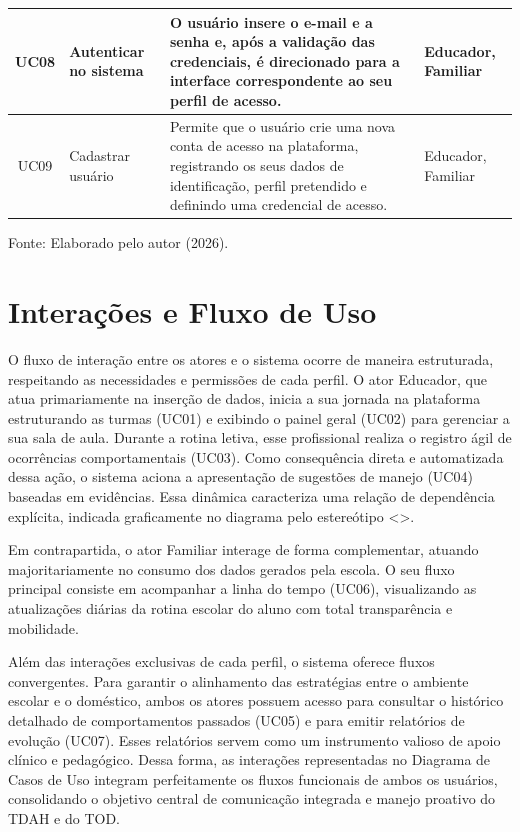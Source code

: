 \begin{quadro}[H]
\begin{tabular}{|c|p{3.2cm}|p{7.3cm}|p{2.5cm}|}
        UC08 & Autenticar no sistema & O usuário insere o e-mail e a senha e, após a validação das credenciais, é direcionado para a interface correspondente ao seu perfil de acesso. & Educador, Familiar \\ \hline

        UC09 & Cadastrar usuário & Permite que o usuário crie uma nova conta de acesso na plataforma, registrando os seus dados de identificação, perfil pretendido e definindo uma credencial de acesso. & Educador, Familiar \\ \hline
    \end{tabular}
    
    \vspace{0.1cm}
    \begin{flushleft}
        \footnotesize Fonte: Elaborado pelo autor (2026).
    \end{flushleft}
\end{quadro}

\vspace{0.5cm}
\section{Interações e Fluxo de Uso}

O fluxo de interação entre os atores e o sistema ocorre de maneira estruturada, respeitando as necessidades e permissões de cada perfil. O ator Educador, que atua primariamente na inserção de dados, inicia a sua jornada na plataforma estruturando as turmas (UC01) e exibindo o painel geral (UC02) para gerenciar a sua sala de aula. Durante a rotina letiva, esse profissional realiza o registro ágil de ocorrências comportamentais (UC03). Como consequência direta e automatizada dessa ação, o sistema aciona a apresentação de sugestões de manejo (UC04) baseadas em evidências. Essa dinâmica caracteriza uma relação de dependência explícita, indicada graficamente no diagrama pelo estereótipo <>.

Em contrapartida, o ator Familiar interage de forma complementar, atuando majoritariamente no consumo dos dados gerados pela escola. O seu fluxo principal consiste em acompanhar a linha do tempo (UC06), visualizando as atualizações diárias da rotina escolar do aluno com total transparência e mobilidade.

Além das interações exclusivas de cada perfil, o sistema oferece fluxos convergentes. Para garantir o alinhamento das estratégias entre o ambiente escolar e o doméstico, ambos os atores possuem acesso para consultar o histórico detalhado de comportamentos passados (UC05) e para emitir relatórios de evolução (UC07). Esses relatórios servem como um instrumento valioso de apoio clínico e pedagógico. Dessa forma, as interações representadas no Diagrama de Casos de Uso integram perfeitamente os fluxos funcionais de ambos os usuários, consolidando o objetivo central de comunicação integrada e manejo proativo do TDAH e do TOD.

